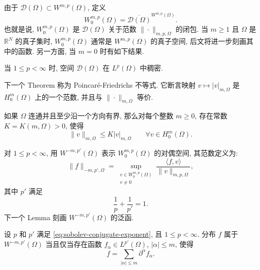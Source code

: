 由于 $\mathcal D(\Omega)\subset W^{m,p}(\Omega)$, 定义
\[
  W_0^{m,p}(\Omega)=\overline{\mathcal D(\Omega)}^{W^{m,p}(\Omega)}.
\]
也就是说, $W_0^{m,p}(\Omega)$ 是 $\mathcal D(\Omega)$ 关于范数 $\|\cdot\|_{m,p,\Omega}$ 的闭包.
当 $m\geq1$ 且 $\Omega$ 是 $\mathbb R^N$ 的真子集时, $W_0^{m,p}(\Omega)$ 通常是
$W^{m,p}(\Omega)$ 的真子空间, 后文将进一步刻画其中的函数. 另一方面, 当 $m=0$ 时有如下结果.

\setcounter{statement}{0}
\renewcommand{\theHstatement}{lemma.\thesection.\arabic{statement}}
\begin{Lemma}\label{lem:test-functions-dense-lp}
当 $1\leq p<\infty$ 时, 空间 $\mathcal D(\Omega)$ 在 $L^p(\Omega)$ 中稠密.
\end{Lemma}

下一个 Theorem 称为 Poincaré-Friedrichs 不等式. 它断言映射
$v\mapsto|v|_{m,\Omega}$ 是 $H_0^m(\Omega)$ 上的一个范数, 并且与 $\|\cdot\|_{m,\Omega}$ 等价.

\setcounter{statement}{0}
\renewcommand{\theHstatement}{theorem.\thesection.\arabic{statement}}
\begin{Theorem}\label{thm:poincare-friedrichs}
如果 $\Omega$ 连通并且至少沿一个方向有界, 那么对每个整数 $m\geq0$, 存在常数
$K=K(m,\Omega)>0$, 使得
\begin{equation}\label{eq:poincare-friedrichs}
  \|v\|_{m,\Omega}\leq K|v|_{m,\Omega}
  \qquad\forall v\in H_0^m(\Omega).
\end{equation}
\end{Theorem}

对 $1\leq p<\infty$, 用 $W^{-m,p'}(\Omega)$ 表示 $W_0^{m,p}(\Omega)$ 的对偶空间,
其范数定义为:
\begin{equation}\label{eq:negative-sobolev-dual-norm}
  \|f\|_{-m,p',\Omega}=
  \sup_{\substack{v\in W_0^{m,p}(\Omega)\\v\neq0}}
  \frac{\langle f,v\rangle}{\|v\|_{m,p,\Omega}},
\end{equation}
其中 $p'$ 满足
\begin{equation}\label{eq:sobolev-conjugate-exponent}
  \frac1p+\frac1{p'}=1.
\end{equation}
下一个 Lemma 刻画 $W^{-m,p'}(\Omega)$ 的泛函.

\setcounter{statement}{1}
\renewcommand{\theHstatement}{lemma.\thesection.\arabic{statement}}
\begin{Lemma}\label{lem:negative-sobolev-distribution-characterization}
设 $p$ 和 $p'$ 满足 \eqref{eq:sobolev-conjugate-exponent}, 且 $1\leq p<\infty$.
分布 $f$ 属于 $W^{-m,p'}(\Omega)$ 当且仅当存在函数
$f_\alpha\in L^{p'}(\Omega)$, $|\alpha|\leq m$, 使得
\[
  f=\sum_{|\alpha|\leq m}\partial^\alpha f_\alpha.
\]
\end{Lemma}

